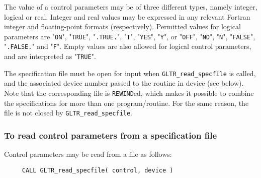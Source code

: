 \documentclass{galahad}
\newcommand{\packagename}{GL\-TR}
\begin{document}
The value of a control parameters may be of three different types, namely
integer, logical or real.
Integer and real values may be expressed in any relevant Fortran integer and
floating-point formats (respectively). Permitted values for logical
parameters are "{\tt ON}", "{\tt TRUE}", "{\tt .TRUE.}", "{\tt T}",
"{\tt YES}", "{\tt Y}", or "{\tt OFF}", "{\tt NO}",
"{\tt N}", "{\tt FALSE}", "{\tt .FALSE.}" and "{\tt F}".
Empty values are also allowed for
logical control parameters, and are interpreted as "{\tt TRUE}".

The specification file must be open for
input when {\tt \packagename\_read\_specfile}
is called, and the associated device number
passed to the routine in device (see below).
Note that the corresponding
file is {\tt REWIND}ed, which makes it possible to combine the specifications
for more than one program/routine.  For the same reason, the file is not
closed by {\tt \packagename\_read\_specfile}.

\subsubsection{To read control parameters from a specification file}
\label{readspec}

Control parameters may be read from a file as follows:
\hskip0.5in
\def\baselinestretch{0.8} {\tt \begin{verbatim}
     CALL GLTR_read_specfile( control, device )
\end{verbatim}}
\def\baselinestretch{1.0}
\end{document}
